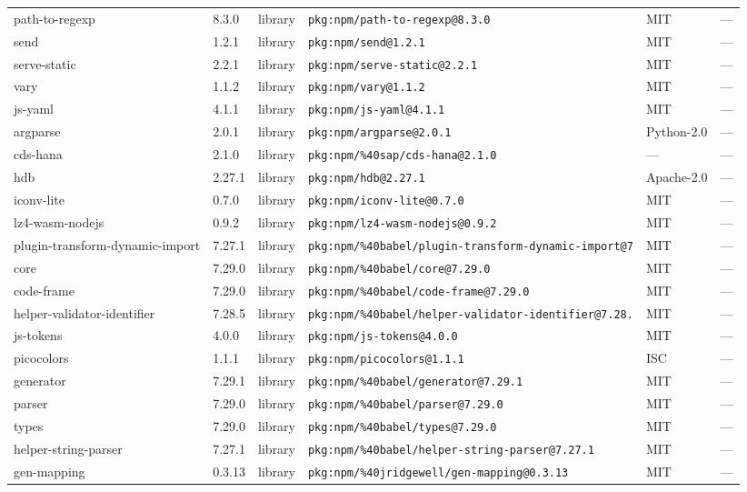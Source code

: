 \documentclass[11pt]{article}
\begin{document}
\begin{longtable}{|l|l|l|p{2.2cm}|l|p{4cm}|}
path-to-regexp & 8.3.0 & library & \texttt{pkg:npm/path-to-regexp@8.3.0} & MIT & — \\
send & 1.2.1 & library & \texttt{pkg:npm/send@1.2.1} & MIT & — \\
serve-static & 2.2.1 & library & \texttt{pkg:npm/serve-static@2.2.1} & MIT & — \\
vary & 1.1.2 & library & \texttt{pkg:npm/vary@1.1.2} & MIT & — \\
js-yaml & 4.1.1 & library & \texttt{pkg:npm/js-yaml@4.1.1} & MIT & — \\
argparse & 2.0.1 & library & \texttt{pkg:npm/argparse@2.0.1} & Python-2.0 & — \\
cds-hana & 2.1.0 & library & \texttt{pkg:npm/\%40sap/cds-hana@2.1.0} & — & — \\
hdb & 2.27.1 & library & \texttt{pkg:npm/hdb@2.27.1} & Apache-2.0 & — \\
iconv-lite & 0.7.0 & library & \texttt{pkg:npm/iconv-lite@0.7.0} & MIT & — \\
lz4-wasm-nodejs & 0.9.2 & library & \texttt{pkg:npm/lz4-wasm-nodejs@0.9.2} & MIT & — \\
plugin-transform-dynamic-import & 7.27.1 & library & \texttt{pkg:npm/\%40babel/plugin-transform-dynamic-import@7} & MIT & — \\
core & 7.29.0 & library & \texttt{pkg:npm/\%40babel/core@7.29.0} & MIT & — \\
code-frame & 7.29.0 & library & \texttt{pkg:npm/\%40babel/code-frame@7.29.0} & MIT & — \\
helper-validator-identifier & 7.28.5 & library & \texttt{pkg:npm/\%40babel/helper-validator-identifier@7.28.} & MIT & — \\
js-tokens & 4.0.0 & library & \texttt{pkg:npm/js-tokens@4.0.0} & MIT & — \\
picocolors & 1.1.1 & library & \texttt{pkg:npm/picocolors@1.1.1} & ISC & — \\
generator & 7.29.1 & library & \texttt{pkg:npm/\%40babel/generator@7.29.1} & MIT & — \\
parser & 7.29.0 & library & \texttt{pkg:npm/\%40babel/parser@7.29.0} & MIT & — \\
types & 7.29.0 & library & \texttt{pkg:npm/\%40babel/types@7.29.0} & MIT & — \\
helper-string-parser & 7.27.1 & library & \texttt{pkg:npm/\%40babel/helper-string-parser@7.27.1} & MIT & — \\
gen-mapping & 0.3.13 & library & \texttt{pkg:npm/\%40jridgewell/gen-mapping@0.3.13} & MIT & — \\

\end{longtable}
\end{document}
